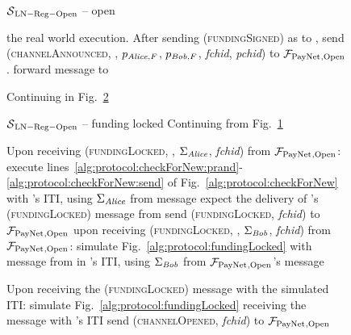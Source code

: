 \begin{figure}[!htbp]
\begin{simulatorbox}{$\mathcal{S}{}_{\mathrm{LN - Reg - Open}}$ -- open}
\begin{algorithmic}[1]
          the real world execution.
          \State After sending (\textsc{fundingSigned}) as \bob{} to \alice,
          send (\textsc{channelAnnounced}, \bob, $p_{\mathit{Alice}, F}$, $p_{\mathit{Bob}, F}$,
          \textit{fchid}, \textit{pchid}) to $\mathcal{F}_{\mathrm{PayNet}}{}_{\mathrm{, Open}}$.
          \label{alg:sim:open:announced:bob:bobhonest}
          \State forward message to \adversary{} 
        \EndIf
      \EndIndent
    \end{algorithmic}
    Continuing in Fig.~\ref{alg:sim:open:fundingLocked}
  \end{simulatorbox}
  \caption{}
  \label{alg:sim:open}
\end{figure}

\begin{figure}[!htbp]
  \begin{simulatorbox}{$\mathcal{S}{}_{\mathrm{LN - Reg - Open}}$ -- funding
  locked}
    Continuing from Fig.~\ref{alg:sim:open}
    \begin{algorithmic}[1]
      \State Upon receiving (\textsc{fundingLocked}, \alice, $\Sigma_{\mathit{Alice}}$,
      \textit{fchid}) from $\mathcal{F}_{\mathrm{PayNet}}{}_{\mathrm{, Open}}$:
      \Indent
        \State execute
        lines~\ref{alg:protocol:checkForNew:prand}-\ref{alg:protocol:checkForNew:send}
        of Fig.~\ref{alg:protocol:checkForNew} with \alice's ITI, using
        $\Sigma_{\mathit{Alice}}$ from message
        \label{alg:sim:fundingLocked:sim:alice}
          \State expect the delivery of \alice's (\textsc{fundingLocked})
          message from \adversary
          \State send (\textsc{fundingLocked}, \textit{fchid}) to
          $\mathcal{F}_{\mathrm{PayNet}}{}_{\mathrm{, Open}}$
          \State upon receiving (\textsc{fundingLocked}, \bob, $\Sigma_{\mathit{Bob}}$,
          \textit{fchid}) from $\mathcal{F}_{\mathrm{PayNet}}{}_{\mathrm{, Open}}$:
          \State simulate Fig.~\ref{alg:protocol:fundingLocked} with message
          from \alice{} in \bob's ITI, using $\Sigma_{\mathit{Bob}}$ from
          $\mathcal{F}_{\mathrm{PayNet}}{}_{\mathrm{, Open}}$'s message
          \label{alg:sim:fundingLocked:sim:bob}
        \EndIf
      \EndIndent
      \Statex

      \State Upon receiving the (\textsc{fundingLocked}) message with the
      simulated \alice{} ITI:
      \Indent
        \State simulate Fig.~\ref{alg:protocol:fundingLocked} receiving
        the message with \alice's ITI
        \State send (\textsc{channelOpened}, \textit{fchid}) to
        $\mathcal{F}_{\mathrm{PayNet}}{}_{\mathrm{, Open}}$
        \label{alg:sim:open:channelOpened}
      \EndIndent
    \end{algorithmic}
  \end{simulatorbox}
  \caption{}
  \label{alg:sim:open:fundingLocked}
\end{figure}

